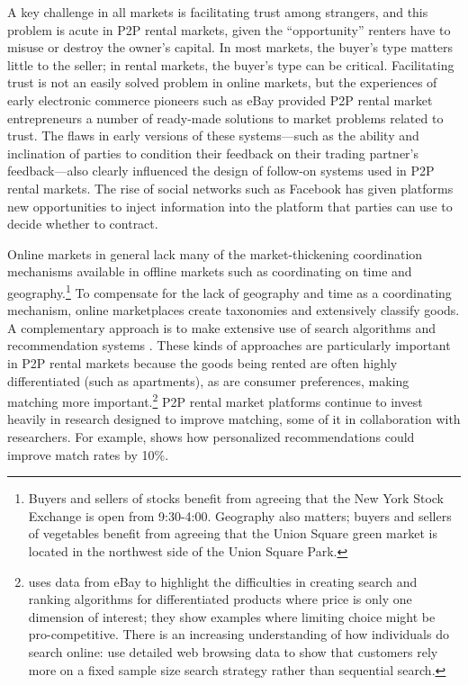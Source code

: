 \documentclass[11pt]{article}
\begin{document}
A key challenge in all markets is facilitating trust among strangers, and this problem is acute in P2P rental markets, given the ``opportunity'' renters have to misuse or destroy the owner's capital.
In most markets, the buyer's type matters little to the seller; in rental markets, the buyer's type can be critical. 
Facilitating trust is not an easily solved problem in online markets, but the experiences of early electronic commerce pioneers such as eBay provided P2P rental market entrepreneurs a number of ready-made solutions to market problems related to trust. 
The flaws in early versions of these systems---such as the ability and inclination of parties to condition their feedback on their trading partner's feedback---also clearly influenced the design of follow-on systems used in P2P rental markets. 
The rise of social networks such as Facebook has given platforms new opportunities to inject information into the platform that parties can use to decide whether to contract. 

Online markets in general lack many of the market-thickening coordination mechanisms available in offline markets such as coordinating on time and geography.\footnote{
  Buyers and sellers of stocks benefit from agreeing that the New York Stock Exchange is open from 9:30-4:00.
  Geography also matters; buyers and sellers of vegetables benefit from agreeing that the Union Square green market is located in the northwest side of the Union Square Park.
}
To compensate for the lack of geography and time as a coordinating mechanism, online marketplaces create taxonomies and extensively classify goods.
A complementary approach is to make extensive use of search algorithms and recommendation systems \citep{resnick1997recommender, adomavicius2005toward}.
These kinds of approaches are particularly important in P2P rental markets because the goods being rented are often highly differentiated (such as apartments), as are consumer preferences, making matching more important.\footnote{
  \cite{dinerstein2014consumer} uses data from eBay to highlight the difficulties in creating search and ranking algorithms for differentiated products where price is only one dimension of interest; they show examples where limiting choice might be pro-competitive.
  There is an increasing understanding of how individuals do search online: 
  \cite{de2012testing} use detailed web browsing data to show that customers rely more on a fixed sample size search strategy rather than sequential search.  
}
P2P rental market platforms continue to invest heavily in research designed to improve matching, some of it in collaboration with researchers. 
For example, \cite{fradkin2013search} shows how personalized recommendations could improve match rates by 10\%. 
\end{document}
